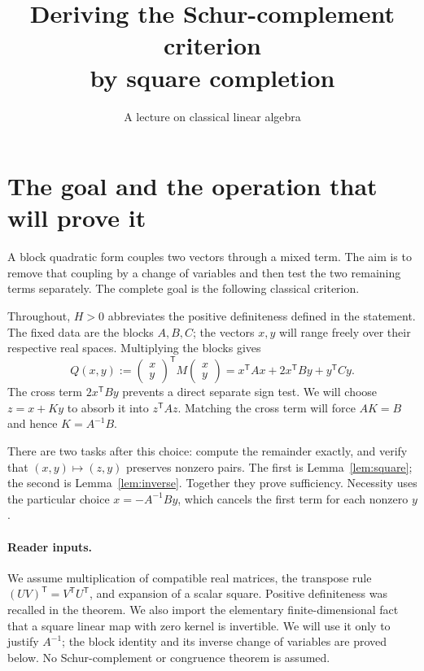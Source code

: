 \documentclass[12pt,reqno]{amsart}
\title[Square completion and the Schur complement]{Deriving the Schur-complement criterion\\by square completion}
\author{A lecture on classical linear algebra}
\date{}
\begin{document}
\maketitle

\section{The goal and the operation that will prove it}
A block quadratic form couples two vectors through a mixed term. The aim
is to remove that coupling by a change of variables and then test the two
remaining terms separately. The complete goal is the following classical
criterion.
\begin{theorem}\label{thm:main}

\end{theorem}
Throughout, $H>0$ abbreviates the positive definiteness defined in the
statement. The fixed data are the blocks $A,B,C$; the vectors $x,y$ will
range freely over their respective real spaces. Multiplying the blocks gives
\begin{equation}\label{eq:Q}
 Q(x,y):=\begin{pmatrix}x\\y\end{pmatrix}^{\!\mathsf T}
 M\begin{pmatrix}x\\y\end{pmatrix}
 =x^{\mathsf T}Ax+2x^{\mathsf T}By+y^{\mathsf T}Cy.
\end{equation}
The cross term $2x^{\mathsf T}By$ prevents a direct separate sign test.
We will choose $z=x+Ky$ to absorb it into $z^{\mathsf T}Az$. Matching the
cross term will force $AK=B$ and hence $K=A^{-1}B$.

There are two tasks after this choice: compute the remainder exactly, and
verify that $(x,y)\mapsto(z,y)$ preserves nonzero pairs. The first is
Lemma~\ref{lem:square}; the second is Lemma~\ref{lem:inverse}. Together they
prove sufficiency. Necessity uses the particular choice $x=-A^{-1}By$,
which cancels the first term for each nonzero $y$.

\paragraph{Reader inputs.}
We assume multiplication of compatible real matrices, the transpose rule
$(UV)^{\mathsf T}=V^{\mathsf T}U^{\mathsf T}$, and expansion of a scalar
square. Positive definiteness was recalled in the theorem. We also import
the elementary finite-dimensional fact that a square linear map with zero
kernel is invertible. We will use it only to justify $A^{-1}$; the block
identity and its inverse change of variables are proved below.
No Schur-complement or congruence theorem is assumed.
\end{document}
